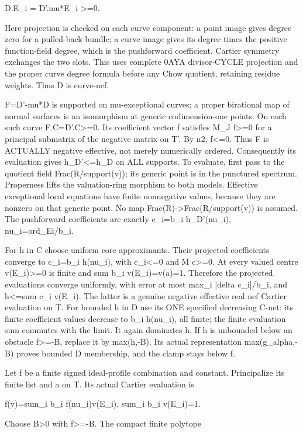 \documentclass[11pt]{article}
\begin{document}
    D.E\_i = D'.mu*E\_i >=0.

Here projection is checked on each curve component: a point image gives degree zero for a pulled-back bundle; a curve image gives its degree times the positive function-field degree, which is the pushforward coefficient. Cartier symmetry exchanges the two slots. This uses complete 0AYA divisor-CYCLE projection and the proper curve degree formula before any Chow quotient, retaining residue weights. Thus D is curve-nef.

F=D'-mu*D is supported on mu-exceptional curves; a proper birational map of normal surfaces is an isomorphism at generic codimension-one points. On each such curve F.C=D'.C>=0. Its coefficient vector f satisfies M\_J f>=0 for a principal submatrix of the negative matrix on T'. By n2, f<=0. Thus F is ACTUALLY negative effective, not merely numerically ordered. Consequently its evaluation gives h\_D'<=h\_D on ALL supports. To evaluate, first pass to the quotient field Frac(R/support(v)); its generic point is in the punctured spectrum. Properness lifts the valuation-ring morphism to both models. Effective exceptional local equations have finite nonnegative values, because they are nonzero on that generic point. No map Frac(R)->Frac(R/support(v)) is assumed. The pushforward coefficients are exactly c\_i=b\_i h\_D'(nu\_i), nu\_i=ord\_Ei/b\_i.

For h in C choose uniform core approximants. Their projected coefficients converge to c\_i=b\_i h(nu\_i), with c\_i<=0 and M c>=0. At every valued centre v(E\_i)>=0 is finite and sum b\_i v(E\_i)=v(a)=1. Therefore the projected evaluations converge uniformly, with error at most max\_i |delta c\_i|/b\_i, and h<=sum c\_i v(E\_i). The latter is a genuine negative effective real nef Cartier evaluation on T. For bounded h in D use its ONE specified decreasing C-net: its finite coefficient values decrease to b\_i h(nu\_i), all finite; the finite evaluation sum commutes with the limit. It again dominates h. If h is unbounded below an obstacle f>=-B, replace it by max(h,-B). Its actual representation max(g\_alpha,-B) proves bounded D membership, and the clamp stays below f.

Let f be a finite signed ideal-profile combination and constant. Principalize its finite list and a on T. Its actual Cartier evaluation is

    f(v)=sum\_i b\_i f(nu\_i)v(E\_i),    sum\_i b\_i v(E\_i)=1.

Choose B>0 with f>=-B. The compact finite polytope
\end{document}
